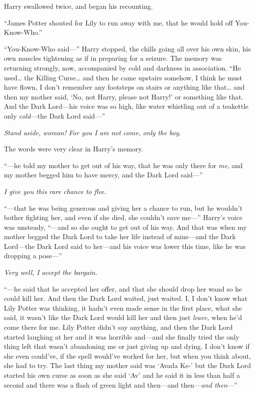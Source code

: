 Harry swallowed twice, and began his recounting.

``James Potter shouted for Lily to run away with me, that he would hold
off You-Know-Who.''

``You-Know-Who said---'' Harry stopped, the chills going all over his
own skin, his own muscles tightening as if in preparing for a seizure.
The memory was returning strongly, now, accompanied by cold and darkness
in association. ``He used\ldots{} the Killing Curse\ldots{} and then he
came upstairs somehow, I think he must have flown, I don't remember any
footsteps on stairs or anything like that\ldots{} and then my mother
said, `No, not Harry, please not Harry!' or something like that. And the
Dark Lord---his voice was so high, like water whistling out of a
teakettle only \emph{cold}---the Dark Lord said---''

\emph{Stand aside, woman! For you I am not come, only the boy.}

The words were very clear in Harry's memory.

``---he told my mother to get out of his way, that he was only there for
\emph{me}, and my mother begged him to have mercy, and the Dark Lord
said---''

\emph{I give you this rare chance to flee.}

``---that he was being generous and giving her a chance to run, but he
wouldn't bother fighting her, and even if she died, she couldn't save
me---'' Harry's voice was unsteady, ``---and so she ought to get out of
his way. And that was when my mother begged the Dark Lord to take her
life instead of mine---and the Dark Lord---the Dark Lord said to
her---and his voice was lower this time, like he was dropping a
pose---''

\emph{Very well, I accept the bargain.}

``---he said that he accepted her offer, and that she should drop her
wand so he could kill her. And then the Dark Lord waited, just waited.
I, I don't know what Lily Potter was thinking, it hadn't even made sense
in the first place, what she said, it wasn't like the Dark Lord would
kill her and then just \emph{leave,} when he'd come there for me. Lily
Potter didn't say anything, and then the Dark Lord started laughing at
her and it was horrible and---and she finally tried the only thing left
that wasn't abandoning me or just giving up and dying. I don't know if
she even could've, if the spell would've worked for her, but when you
think about, she had to try. The last thing my mother said was `Avada
Ke-' but the Dark Lord started his own curse as soon as she said `Av'
and he said it in less than half a second and there was a flash of green
light and then---and then---\emph{and then}---''

